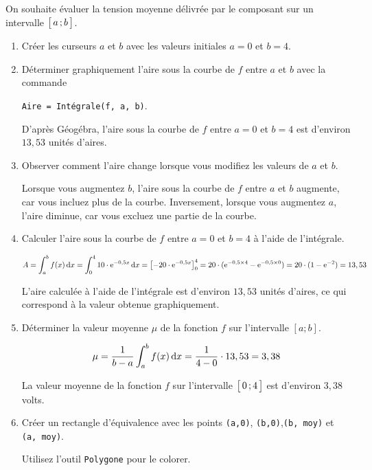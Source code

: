\documentclass[11pt, a4paper]{report}
\begin{document}
On souhaite évaluer la tension moyenne délivrée par le composant sur un intervalle $\bigl[ \, a \, ; b \,\bigl]$.

\begin{enumerate}[resume]
    \item Créer les curseurs $a$ et $b$ avec les valeurs initiales $a=0$ et $b=4$.   
    \item Déterminer graphiquement l'aire sous la courbe de $f$ entre $a$ et $b$ avec la commande 
    
    \verb|Aire = Intégrale(f, a, b)|.   
    \begin{blocvisible}[height=1.]
        D'après Géogébra, l'aire sous la courbe de $f$ entre $a=0$ et $b=4$ est d'environ $13,53$ unités d'aires.
    \end{blocvisible}       
    
    \pagebreak
    \thispagestyle{DS_LP}

    \item Observer comment l'aire change lorsque vous modifiez les valeurs de $a$ et $b$.  
    \begin{blocvisible}[height=2]
        Lorsque vous augmentez $b$, l'aire sous la courbe de $f$ entre $a$ et $b$ augmente, car vous incluez plus de la courbe. Inversement, lorsque vous augmentez $a$, l'aire diminue, car vous excluez une partie de la courbe.
    \end{blocvisible}
    \item Calculer l'aire sous la courbe de $f$ entre $a=0$ et $b=4$ à l'aide de l'intégrale.  
    \begin{blocvisible}[height=3]
        \[A=\int_a^b f(x) \,\mathrm{d}x = \int_0^4 10\cdot \mathrm{e}^{-0,5x} \,\mathrm{d}x = {\left[-20\cdot \mathrm{e}^{-0,5x} \right]}_0^4 =  20 \cdot (\mathrm{e}^{-0,5\times 4} - \mathrm{e}^{-0,5\times 0}) = 20 \cdot (1 - \mathrm{e}^{-2}) = 13,53\]

        L'aire calculée à l'aide de l'intégrale est d'environ $13,53$ unités d'aires, ce qui correspond à la valeur obtenue graphiquement.
    \end{blocvisible}
    \item Déterminer la valeur moyenne $\mu$ de la fonction $f$ sur l'intervalle $[a ; b]$.  
    \begin{blocvisible}[height=2]           
        \[\mu = \frac{1}{b-a} \int_a^b f(x) \,\mathrm{d}x = \frac{1}{4-0} \cdot 13,53 = 3,38\]

        La valeur moyenne de la fonction $f$ sur l'intervalle $\bigl[ \, 0 \, ; 4 \,\bigl]$ est d'environ $3,38$ volts.
    \end{blocvisible}
    \item Créer un rectangle d'équivalence avec les points \verb|(a,0)|, \verb|(b,0)|,\verb|(b, moy)| et \verb|(a, moy)|. 
    
    Utilisez l'outil \verb|Polygone| pour le colorer.  
\end{enumerate}
\end{document}
